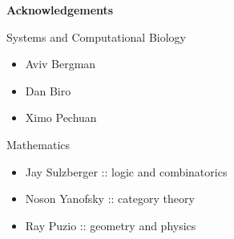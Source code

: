 \begin{frame}
\textbf{Acknowledgements}
\begin{block}{Systems and Computational Biology}
\begin{small}
\begin{itemize}
\item Aviv Bergman
\item Dan Biro
\item Ximo Pechuan
\end{itemize}
\end{small}
\end{block}
\begin{block}{Mathematics}
\begin{small}
\begin{itemize}
\item Jay Sulzberger :: logic and combinatorics
\item Noson Yanofsky :: category theory
\item Ray Puzio :: geometry and physics
\end{itemize}
\end{small}
\end{block}
\end{frame}

